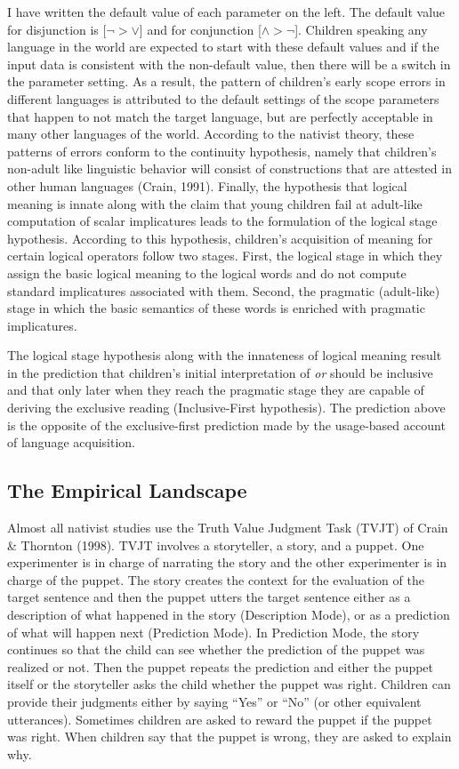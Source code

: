 \documentclass[oneside]{report}
\theoremstyle{definition}
\theoremstyle{definition}
\theoremstyle{definition}
\theoremstyle{remark}
\begin{document}
I have written the default value of each parameter on the left. The
default value for disjunction is {[}\(\lnot > \lor\){]} and for
conjunction {[}\(\land > \lnot\){]}. Children speaking any language in
the world are expected to start with these default values and if the
input data is consistent with the non-default value, then there will be
a switch in the parameter setting. As a result, the pattern of
children's early scope errors in different languages is attributed to
the default settings of the scope parameters that happen to not match
the target language, but are perfectly acceptable in many other
languages of the world. According to the nativist theory, these patterns
of errors conform to the continuity hypothesis, namely that children's
non-adult like linguistic behavior will consist of constructions that
are attested in other human languages (Crain, 1991). Finally, the
hypothesis that logical meaning is innate along with the claim that
young children fail at adult-like computation of scalar implicatures
leads to the formulation of the logical stage hypothesis. According to
this hypothesis, children's acquisition of meaning for certain logical
operators follow two stages. First, the logical stage in which they
assign the basic logical meaning to the logical words and do not compute
standard implicatures associated with them. Second, the pragmatic
(adult-like) stage in which the basic semantics of these words is
enriched with pragmatic implicatures.

The logical stage hypothesis along with the innateness of logical
meaning result in the prediction that children's initial interpretation
of \emph{or} should be inclusive and that only later when they reach the
pragmatic stage they are capable of deriving the exclusive reading
(Inclusive-First hypothesis). The prediction above is the opposite of
the exclusive-first prediction made by the usage-based account of
language acquisition.

\subsection{The Empirical Landscape}\label{GriceanEmpirical}

Almost all nativist studies use the Truth Value Judgment Task (TVJT) of
Crain \& Thornton (1998). TVJT involves a storyteller, a story, and a
puppet. One experimenter is in charge of narrating the story and the
other experimenter is in charge of the puppet. The story creates the
context for the evaluation of the target sentence and then the puppet
utters the target sentence either as a description of what happened in
the story (Description Mode), or as a prediction of what will happen
next (Prediction Mode). In Prediction Mode, the story continues so that
the child can see whether the prediction of the puppet was realized or
not. Then the puppet repeats the prediction and either the puppet itself
or the storyteller asks the child whether the puppet was right. Children
can provide their judgments either by saying ``Yes'' or ``No'' (or other
equivalent utterances). Sometimes children are asked to reward the
puppet if the puppet was right. When children say that the puppet is
wrong, they are asked to explain why.
\end{document}
